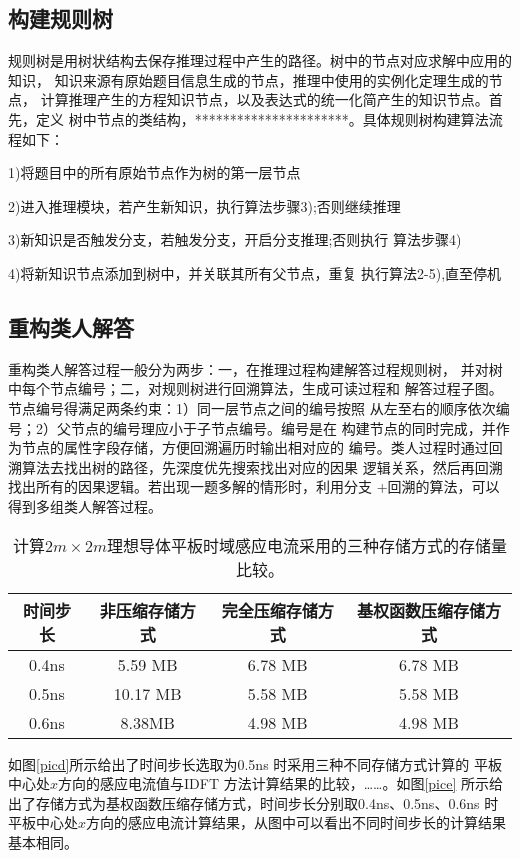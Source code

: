 \documentclass{standalone}
\begin{document}
\subsection{构建规则树}
规则树是用树状结构去保存推理过程中产生的路径。树中的节点对应求解中应用的知识，
知识来源有原始题目信息生成的节点，推理中使用的实例化定理生成的节点，
计算推理产生的方程知识节点，以及表达式的统一化简产生的知识节点。首先，定义
树中节点的类结构，**********************。具体规则树构建算法流程如下：

1)将题目中的所有原始节点作为树的第一层节点

2)进入推理模块，若产生新知识，执行算法步骤3);否则继续推理

3)新知识是否触发分支，若触发分支，开启分支推理;否则执行
算法步骤4)

4)将新知识节点添加到树中，并关联其所有父节点，重复
执行算法2-5),直至停机

\subsection{重构类人解答}
重构类人解答过程一般分为两步：一，在推理过程构建解答过程规则树，
并对树中每个节点编号；二，对规则树进行回溯算法，生成可读过程和
解答过程子图。节点编号得满足两条约束：1）同一层节点之间的编号按照
从左至右的顺序依次编号；2）父节点的编号理应小于子节点编号。编号是在
构建节点的同时完成，并作为节点的属性字段存储，方便回溯遍历时输出相对应的
编号。类人过程时通过回溯算法去找出树的路径，先深度优先搜索找出对应的因果
逻辑关系，然后再回溯找出所有的因果逻辑。若出现一题多解的情形时，利用分支
+回溯的算法，可以得到多组类人解答过程。

\begin{table}[h]
	\caption{计算$2m\times 2m$理想导体平板时域感应电流采用的三种存储方式的存储量比较。} 
	\begin{tabular}{|c|c|c|c|} 
		\hline  
		时间步长 & 非压缩存储方式 & 完全压缩存储方式 & 基权函数压缩存储方式 \\
		\hline 
		0.4ns & 5.59 MB & 6.78 MB & 6.78 MB\\  
		\hline  
		0.5ns & 10.17 MB & 5.58 MB & 5.58 MB \\  
		\hline  
		0.6ns & 8.38MB & 4.98 MB & 4.98 MB \\  
		\hline  
	\end{tabular}
	\label{tablea}
\end{table}

如图\ref{picd}所示给出了时间步长选取为0.5ns 时采用三种不同存储方式计算的
平板中心处$x$方向的感应电流值与IDFT 方法计算结果的比较，……。如图\ref{pice}
所示给出了存储方式为基权函数压缩存储方式，时间步长分别取0.4ns、0.5ns、0.6ns
时平板中心处$x$方向的感应电流计算结果，从图中可以看出不同时间步长的计算结果基本相同。
\end{document}
